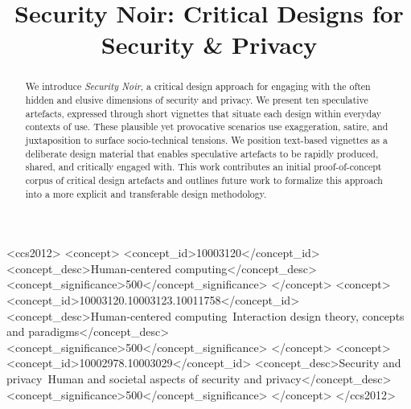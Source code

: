 \documentclass[sigconf]{acmart}
\begin{document}
\title{Security Noir: Critical Designs for Security \& Privacy}

%
%
%

\begin{abstract}

We introduce \textit{Security Noir}, a critical design approach for engaging with the often hidden and elusive dimensions of security and privacy. We present ten speculative artefacts, expressed through short vignettes that situate each design within everyday contexts of use. These plausible yet provocative scenarios use exaggeration, satire, and juxtaposition to surface socio-technical tensions. We position text-based vignettes as a deliberate design material that enables speculative artefacts to be rapidly produced, shared, and critically engaged with. This work contributes an initial proof-of-concept corpus of critical design artefacts and outlines future work to formalize this approach into a more explicit and transferable design methodology.


\end{abstract}

\begin{CCSXML}
<ccs2012>
   <concept>
       <concept_id>10003120</concept_id>
       <concept_desc>Human-centered computing</concept_desc>
       <concept_significance>500</concept_significance>
       </concept>
   <concept>
       <concept_id>10003120.10003123.10011758</concept_id>
       <concept_desc>Human-centered computing~Interaction design theory, concepts and paradigms</concept_desc>
       <concept_significance>500</concept_significance>
       </concept>
   <concept>
       <concept_id>10002978.10003029</concept_id>
       <concept_desc>Security and privacy~Human and societal aspects of security and privacy</concept_desc>
       <concept_significance>500</concept_significance>
       </concept>
 </ccs2012>
\end{CCSXML}
\end{document}
